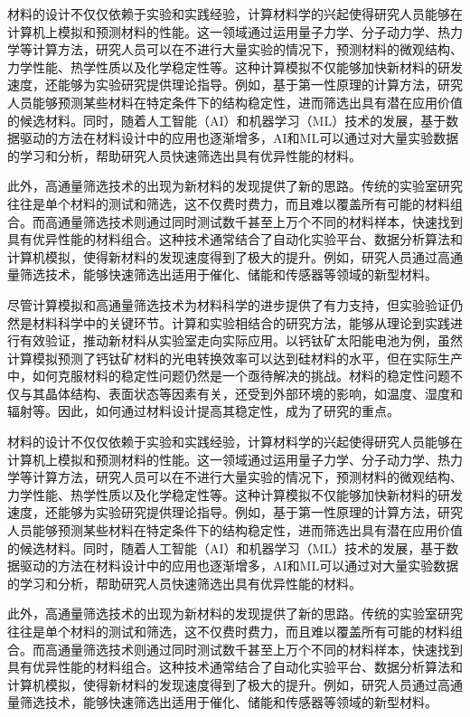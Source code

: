 材料的设计不仅仅依赖于实验和实践经验，计算材料学的兴起使得研究人员能够在计算机上模拟和预测材料的性能。这一领域通过运用量子力学、分子动力学、热力学等计算方法，研究人员可以在不进行大量实验的情况下，预测材料的微观结构、力学性能、热学性质以及化学稳定性等。这种计算模拟不仅能够加快新材料的研发速度，还能够为实验研究提供理论指导。例如，基于第一性原理的计算方法，研究人员能够预测某些材料在特定条件下的结构稳定性，进而筛选出具有潜在应用价值的候选材料。同时，随着人工智能（AI）和机器学习（ML）技术的发展，基于数据驱动的方法在材料设计中的应用也逐渐增多，AI和ML可以通过对大量实验数据的学习和分析，帮助研究人员快速筛选出具有优异性能的材料。\par
此外，高通量筛选技术的出现为新材料的发现提供了新的思路。传统的实验室研究往往是单个材料的测试和筛选，这不仅费时费力，而且难以覆盖所有可能的材料组合。而高通量筛选技术则通过同时测试数千甚至上万个不同的材料样本，快速找到具有优异性能的材料组合。这种技术通常结合了自动化实验平台、数据分析算法和计算机模拟，使得新材料的发现速度得到了极大的提升。例如，研究人员通过高通量筛选技术，能够快速筛选出适用于催化、储能和传感器等领域的新型材料。\par
尽管计算模拟和高通量筛选技术为材料科学的进步提供了有力支持，但实验验证仍然是材料科学中的关键环节。计算和实验相结合的研究方法，能够从理论到实践进行有效验证，推动新材料从实验室走向实际应用。以钙钛矿太阳能电池为例，虽然计算模拟预测了钙钛矿材料的光电转换效率可以达到硅材料的水平，但在实际生产中，如何克服材料的稳定性问题仍然是一个亟待解决的挑战。材料的稳定性问题不仅与其晶体结构、表面状态等因素有关，还受到外部环境的影响，如温度、湿度和辐射等。因此，如何通过材料设计提高其稳定性，成为了研究的重点。\par
材料的设计不仅仅依赖于实验和实践经验，计算材料学的兴起使得研究人员能够在计算机上模拟和预测材料的性能。这一领域通过运用量子力学、分子动力学、热力学等计算方法，研究人员可以在不进行大量实验的情况下，预测材料的微观结构、力学性能、热学性质以及化学稳定性等。这种计算模拟不仅能够加快新材料的研发速度，还能够为实验研究提供理论指导。例如，基于第一性原理的计算方法，研究人员能够预测某些材料在特定条件下的结构稳定性，进而筛选出具有潜在应用价值的候选材料。同时，随着人工智能（AI）和机器学习（ML）技术的发展，基于数据驱动的方法在材料设计中的应用也逐渐增多，AI和ML可以通过对大量实验数据的学习和分析，帮助研究人员快速筛选出具有优异性能的材料。\par
此外，高通量筛选技术的出现为新材料的发现提供了新的思路。传统的实验室研究往往是单个材料的测试和筛选，这不仅费时费力，而且难以覆盖所有可能的材料组合。而高通量筛选技术则通过同时测试数千甚至上万个不同的材料样本，快速找到具有优异性能的材料组合。这种技术通常结合了自动化实验平台、数据分析算法和计算机模拟，使得新材料的发现速度得到了极大的提升。例如，研究人员通过高通量筛选技术，能够快速筛选出适用于催化、储能和传感器等领域的新型材料。\par
